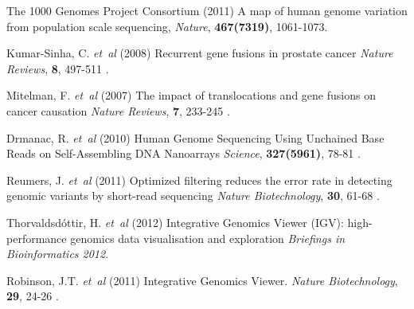 \begin{thebibliography}{}
 The 1000 Genomes Project Consortium (2011) A map of human genome variation from population scale sequencing, {\it Nature}, {\bf 467(7319)}, 1061-1073.

 Kumar-Sinha, C. {\it et~al} (2008) Recurrent gene fusions in prostate cancer {\it Nature Reviews}, {\bf 8}, 497-511 .

 Mitelman, F. {\it et~al} (2007) The impact of translocations and gene fusions on cancer causation {\it Nature Reviews}, {\bf 7}, 233-245 .

 Drmanac, R. {\it et~al} (2010) Human Genome Sequencing Using Unchained Base Reads on Self-Assembling DNA Nanoarrays {\it Science}, {\bf 327(5961)}, 78-81 .

 Reumers, J. {\it et~al} (2011) Optimized filtering reduces the error rate in detecting genomic variants by short-read sequencing {\it Nature Biotechnology}, {\bf 30}, 61-68 .

 Thorvaldsd\'{o}ttir, H. {\it et~al} (2012) Integrative Genomics Viewer (IGV): high-performance genomics data visualisation and exploration {\it Briefings in Bioinformatics 2012}.

 Robinson, J.T. {\it et~al} (2011) Integrative Genomics Viewer. {\it Nature Biotechnology}, {\bf 29}, 24-26 .
\end{thebibliography}






